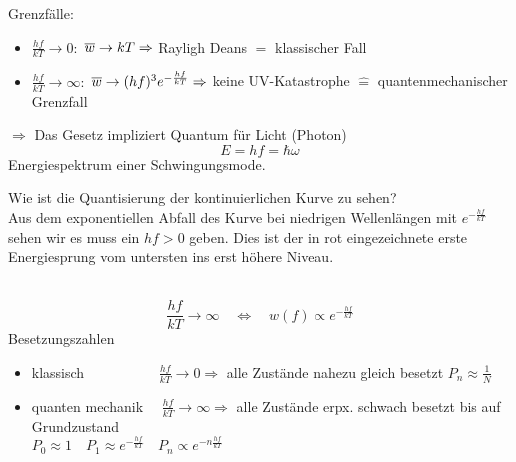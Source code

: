 Grenzfälle:
\begin{itemize}
	\item $ \frac{hf}{kT} \to 0 : $ $ \overline{w} \to kT \Rightarrow $ Rayligh Deans $ \widehat{=} $ klassischer Fall
	\item $ \frac{hf}{kT} \to \infty : $ $ \overline{w} \to (hf)^3 e^{-\frac{hf}{kT}} \Rightarrow $ keine UV-Katastrophe $ \widehat{=} $ quantenmechanischer Grenzfall
\end{itemize}
$ \Rightarrow $ Das Gesetz impliziert Quantum für Licht (Photon)
\begin{equation*}
E = hf = \hbar \omega
\end{equation*}
Energiespektrum einer Schwingungsmode.\\
\begin{minipage}{.6\linewidth}
	Wie ist die Quantisierung der kontinuierlichen Kurve zu sehen?\\
	Aus dem exponentiellen Abfall des Kurve bei niedrigen Wellenlängen mit $ e^{-\frac{hf}{kT}} $ sehen wir es muss ein $ hf > 0 $ geben. Dies ist der in rot eingezeichnete erste Energiesprung vom untersten ins erst höhere Niveau.
\end{minipage}%
\begin{minipage}{.4\linewidth}
	\flushright
\end{minipage}%
\\
\begin{equation*}
\frac{hf}{kT} \to \infty \quad \Leftrightarrow \quad w(f) \propto e^{-\frac{hf}{kT}}
\end{equation*}
Besetzungszahlen
\begin{itemize}
	\item klassisch $ \qquad \qquad \quad \frac{hf}{kT} \to 0  \Rightarrow $ alle Zustände nahezu gleich besetzt $ P_n \approx \frac{1}{N} $
	\item quanten mechanik $ \ \ \ \, \, \frac{hf}{kT} \to \infty \Rightarrow $ alle Zustände erpx. schwach besetzt bis auf Grundzustand\\
	$ P_0 \approx 1 \quad P_1 \approx e^{-\frac{hf}{kT}} \quad P_n \propto e^{- n \frac{hf}{kT}} $
\end{itemize}
